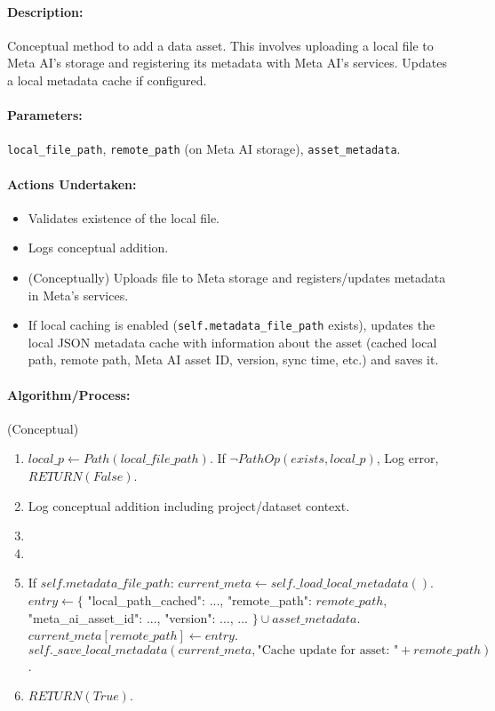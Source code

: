 \documentclass{article}
\begin{document}
\paragraph{Description:} Conceptual method to add a data asset. This involves uploading a local file to Meta AI's storage and registering its metadata with Meta AI's services. Updates a local metadata cache if configured.
\paragraph{Parameters:} \texttt{local\_file\_path}, \texttt{remote\_path} (on Meta AI storage), \texttt{asset\_metadata}.
\paragraph{Actions Undertaken:}
\begin{itemize}
    \item Validates existence of the local file.
    \item Logs conceptual addition.
    \item (Conceptually) Uploads file to Meta storage and registers/updates metadata in Meta's services.
    \item If local caching is enabled (\texttt{self.metadata\_file\_path} exists), updates the local JSON metadata cache with information about the asset (cached local path, remote path, Meta AI asset ID, version, sync time, etc.) and saves it.
\end{itemize}
\paragraph{Algorithm/Process:} (Conceptual)
\begin{enumerate}
    \item $local\_p \leftarrow Path(local\_file\_path)$. If $\neg PathOp(exists, local\_p)$, Log error, $RETURN(False)$.
    \item Log conceptual addition including project/dataset context.
    \item %
    \item %
    \item If $self.metadata\_file\_path$:
        $current\_meta \leftarrow self.\_load\_local\_metadata()$.
        $entry \leftarrow \{$ "local\_path\_cached": ..., "remote\_path": $remote\_path$, "meta\_ai\_asset\_id": ..., "version": ..., ... $\} \cup asset\_metadata$.
        $current\_meta[remote\_path] \leftarrow entry$.
        $self.\_save\_local\_metadata(current\_meta, \text{"Cache update for asset: "} + remote\_path)$.
    \item $RETURN(True)$.
\end{enumerate}
\end{document}
